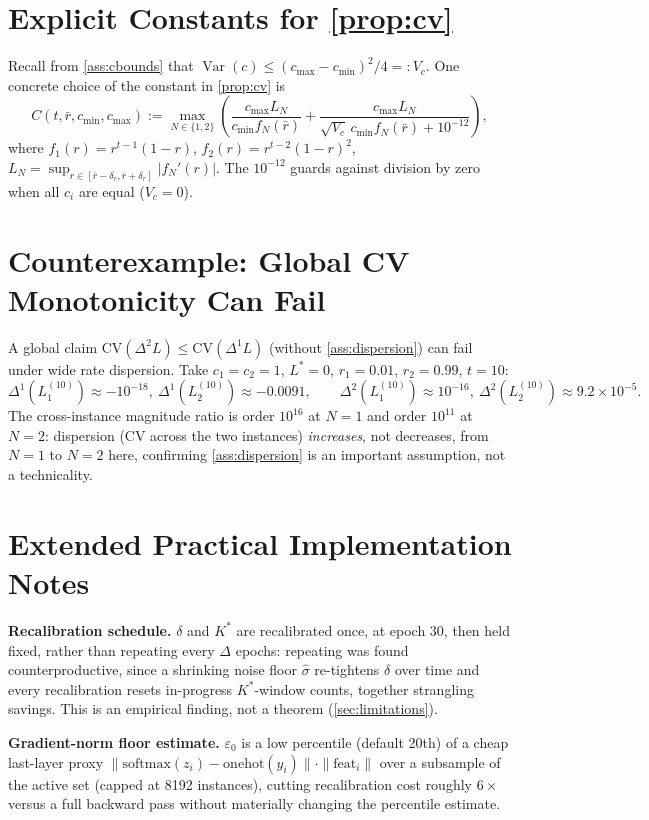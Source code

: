 \documentclass{article}
\theoremstyle{plain}
\theoremstyle{definition}
\theoremstyle{remark}
\DeclareMathOperator{\Var}{Var}
\newcommand{\CV}{\mathrm{CV}}
\begin{document}
\section{Explicit Constants for \cref{prop:cv}}
\label{app:constants}

Recall from \cref{ass:cbounds} that $\Var(c) \le (c_{\max}-c_{\min})^2/4 =: V_c$. One concrete choice of the constant in \cref{prop:cv} is
\[
C(t,\bar r,c_{\min},c_{\max}) := \max_{N\in\{1,2\}}\left(\frac{c_{\max}L_N}{c_{\min}f_N(\bar r)} + \frac{c_{\max}L_N}{\sqrt{V_c}\,c_{\min}f_N(\bar r)+10^{-12}}\right),
\]
where $f_1(r)=r^{t-1}(1-r)$, $f_2(r)=r^{t-2}(1-r)^2$, $L_N=\sup_{r\in[\bar r-\delta_r,\bar r+\delta_r]}|f_N'(r)|$. The $10^{-12}$ guards against division by zero when all $c_i$ are equal ($V_c=0$).

\section{Counterexample: Global CV Monotonicity Can Fail}
\label{app:counterexample}

A global claim $\CV(\Delta^2 L) \le \CV(\Delta^1 L)$ (without \cref{ass:dispersion}) can fail under wide rate dispersion. Take $c_1=c_2=1$, $L^*=0$, $r_1=0.01$, $r_2=0.99$, $t=10$:
\[
\Delta^1(L_1^{(10)})\approx-10^{-18},\ \Delta^1(L_2^{(10)})\approx-0.0091,\qquad
\Delta^2(L_1^{(10)})\approx10^{-16},\ \Delta^2(L_2^{(10)})\approx9.2{\times}10^{-5}.
\]
The cross-instance magnitude ratio is order $10^{16}$ at $N{=}1$ and order $10^{11}$ at $N{=}2$: dispersion (CV across the two instances) \emph{increases}, not decreases, from $N{=}1$ to $N{=}2$ here, confirming \cref{ass:dispersion} is an important assumption, not a technicality.

\section{Extended Practical Implementation Notes}
\label{app:practical}

\textbf{Recalibration schedule.} $\delta$ and $K^*$ are recalibrated once, at epoch 30, then held fixed, rather than repeating every $\Delta$ epochs: repeating was found counterproductive, since a shrinking noise floor $\hat\sigma$ re-tightens $\delta$ over time and every recalibration resets in-progress $K^*$-window counts, together strangling savings. This is an empirical finding, not a theorem (\cref{sec:limitations}).

\textbf{Gradient-norm floor estimate.} $\varepsilon_0$ is a low percentile (default 20th) of a cheap last-layer proxy $\|\mathrm{softmax}(z_i)-\mathrm{onehot}(y_i)\|\cdot\|\mathrm{feat}_i\|$ over a subsample of the active set (capped at 8192 instances), cutting recalibration cost roughly $6\times$ versus a full backward pass without materially changing the percentile estimate.
\end{document}
